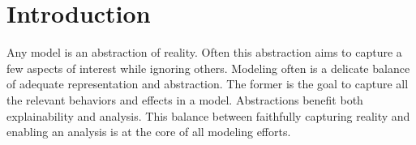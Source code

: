 \chapter{Introduction}


Any model is an abstraction of reality.
Often this abstraction aims to capture a few aspects of interest while ignoring others.
Modeling often is a delicate balance of adequate representation and abstraction.
The former is the goal to capture all the relevant behaviors and effects in a model.
Abstractions benefit both explainability and analysis.
This balance between faithfully capturing reality and enabling an analysis is at the core of all modeling efforts.


